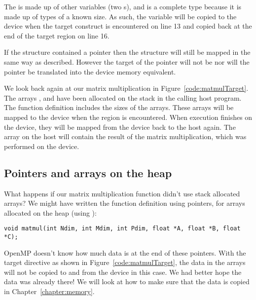 The  is made up of other variables (two s), and is a complete type because it is made up of types of a known size.
As such, the  variable will be copied to the device when the target construct is encountered on line 13 and copied back at the end of the target region on line 16.

If the structure contained a pointer then the structure will still be mapped in the same way as described.
However the target of the pointer will not be nor will the pointer be translated into the device memory equivalent.

We look back again at our matrix multiplication in Figure~\ref{code:matmulTarget}.
The arrays ,  and  have been allocated on the stack in the calling host program.
The  function definition includes the sizes of the arrays.
These arrays will be mapped to the device when the  region is encountered.
When execution finishes on the device, they will be mapped from the device back to the host again.
The  array on the host will contain the result of the matrix multiplication, which was performed on the device.


\subsection{Pointers and arrays on the heap}
\label{sec:implicit_map_pointers}

What happens if our matrix multiplication function didn't use stack allocated arrays?
We might have written the function definition using pointers, for arrays allocated on the heap (using ):
\begin{verbatim}
void matmul(int Ndim, int Mdim, int Pdim, float *A, float *B, float *C);
\end{verbatim}

OpenMP doesn't know how much data is at the end of these pointers.
With the target directive as shown in Figure~\ref{code:matmulTarget}, the data in the arrays will not be copied to and from the device in this case.
We had better hope the data was already there!
We will look at how to make sure that the data is copied in Chapter~\ref{chapter:memory}.

